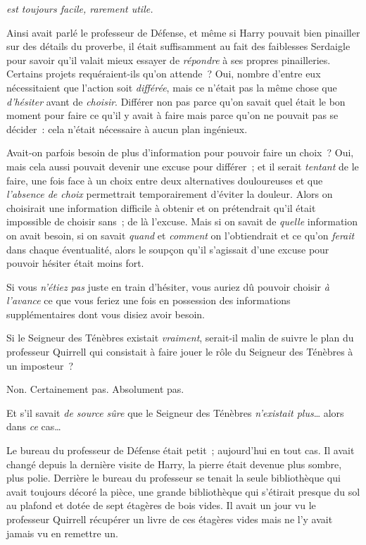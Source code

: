 
 \emph{est toujours facile, rarement utile.}

\hplettrineextrapara
Ainsi avait parlé le professeur de Défense, et même si Harry pouvait bien pinailler sur des détails du proverbe, il était suffisamment au fait des faiblesses Serdaigle pour savoir qu'il valait mieux essayer de \emph{répondre} à ses propres pinailleries. Certains projets requéraient-ils qu'on attende~? Oui, nombre d'entre eux nécessitaient que l'action soit \emph{différée}, mais ce n'était pas la même chose que \emph{d'hésiter} avant de \emph{choisir}. Différer non pas parce qu'on savait quel était le bon moment pour faire ce qu'il y avait à faire mais parce qu'on ne pouvait pas se décider~: cela n'était nécessaire à aucun plan ingénieux.

Avait-on parfois besoin de plus d'information pour pouvoir faire un choix~? Oui, mais cela aussi pouvait devenir une excuse pour différer~; et il serait \emph{tentant} de le faire, une fois face à un choix entre deux alternatives douloureuses et que \emph{l'absence de choix} permettrait temporairement d'éviter la douleur. Alors on choisirait une information difficile à obtenir et on prétendrait qu'il était impossible de choisir sans~; de là l'excuse. Mais si on savait de \emph{quelle} information on avait besoin, si on savait \emph{quand} et \emph{comment} on l'obtiendrait et ce qu'on \emph{ferait} dans chaque éventualité, alors le soupçon qu'il s'agissait d'une excuse pour pouvoir hésiter était moins fort.

Si vous \emph{n'étiez pas} juste en train d'hésiter, vous auriez dû pouvoir choisir \emph{à l'avance} ce que vous feriez une fois en possession des informations supplémentaires dont vous disiez avoir besoin.

Si le Seigneur des Ténèbres existait \emph{vraiment}, serait-il malin de suivre le plan du professeur Quirrell qui consistait à faire jouer le rôle du Seigneur des Ténèbres à un imposteur~?

Non. Certainement pas. Absolument pas.

Et s'il savait \emph{de source sûre} que le Seigneur des Ténèbres \emph{n'existait plus}… alors dans \emph{ce} cas…

Le bureau du professeur de Défense était petit~; aujourd'hui en tout cas. Il avait changé depuis la dernière visite de Harry, la pierre était devenue plus sombre, plus polie. Derrière le bureau du professeur se tenait la seule bibliothèque qui avait toujours décoré la pièce, une grande bibliothèque qui s'étirait presque du sol au plafond et dotée de sept étagères de bois vides. Il avait un jour vu le professeur Quirrell récupérer un livre de ces étagères vides mais ne l’y avait jamais vu en remettre un.

